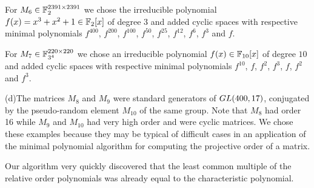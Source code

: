 For $M_6 \in \mathbb{F}_2^{2391 \times 2391}$ we chose the irreducible polynomial
$f(x) = x^3+x^2+1 \in \mathbb{F}_2[x]$ of degree $3$ and added cyclic spaces with 
respective minimal polynomials $f^{400}$, $f^{200}$, $f^{100}$,
$f^{50}$, $f^{25}$, $f^{12}$, $f^6$, $f^3$ and $f$.

For $M_7 \in \mathbb{F}_{3^4}^{220 \times 220}$ we chose an irreducible polynomial
$f(x) \in \mathbb{F}_{10}[x]$ of degree $10$ and added cyclic spaces with
respective minimal polynomials $f^{10}$, $f$, $f^2$, $f^3$, $f$, $f^2$ and
$f^3$.

(d)\quad The matrices $M_8$ and $M_9$ were standard generators of 
${\rm GL}(400,17)$, 
conjugated by the pseu\-do-ran\-dom element $M_{10}$ of the same group.
Note that $M_8$ had
order 16 while $M_9$ and $M_{10}$ had very high order and were cyclic 
matrices. We chose these examples because they may be typical of 
difficult cases in an application of the minimal polynomial algorithm
for computing the projective order of a matrix. 

Our algorithm %
very quickly discovered that the least common multiple of the relative order
polynomials was already equal to the characteristic polynomial.

